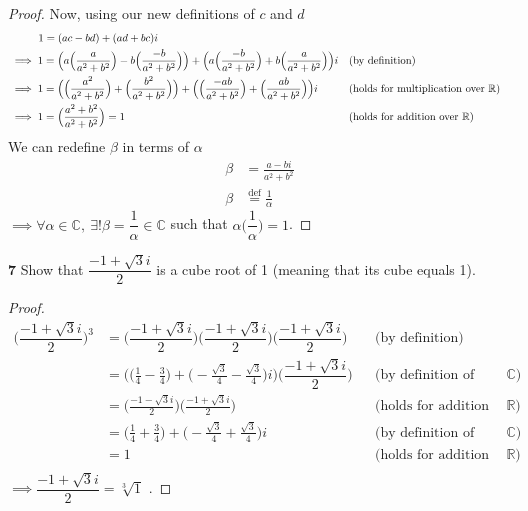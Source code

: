 \documentclass{article}
\begin{document}
\begin{proof}
    \indent Now, using our new definitions of $c$ and $d$
    \begin{align*}
        &\hspace{9.75 mm} 1 = (ac - bd) + (ad + bc)i \\
        &\implies 1 = \Big(a\Big(\frac{a}{a^{2} + b^{2}}\Big) - b\Big(\frac{-b}{a^{2} + b^{2}}\Big)\Big) + \Big(a\Big(\frac{-b}{a^{2} + b^{2}}\Big) + b\Big(\frac{a}{a^{2} + b^{2}}\Big)\Big)i &&\text{(by definition)}\\
        &\implies 1 = \Big(\Big(\frac{a^{2}}{a^{2} + b^{2}}\Big) + \Big(\frac{b^{2}}{a^{2} + b^{2}}\Big)\Big) + \Big(\Big(\frac{-ab}{a^{2} + b^{2}}\Big) + \Big(\frac{ab}{a^{2} + b^{2}}\Big)\Big)i &&\text{(holds for multiplication over $\mathbb{R}$)}\\
        &\implies 1 = \Big(\frac{a^{2} + b^{2}}{a^{2} + b^{2}}\Big) = 1 &&\text{(holds for addition over $\mathbb{R}$)}\\
    \end{align*}
    \indent We can redefine $\beta$ in terms of $\alpha$
    \begin{align*}
        \beta &= \frac{a - bi}{a^{2} + b^{2}}\\
        \beta &\stackrel{\text{def}}{=} \frac{1}{\alpha}
    \end{align*}
    $\implies \forall \alpha \in \mathbb{C}, \ \exists! \beta = \dfrac{1}{\alpha} \in \mathbb{C}$ such that $\alpha\Big(\dfrac{1}{\alpha}\Big) = 1$.
    
\end{proof}
\color{black}

\pagebreak

\noindent \textbf{7} \hspace{3 mm} Show that $\dfrac{-1 + \sqrt{3}i}{2}$ is a cube root of 1 (meaning that its cube equals 1). \color{red}

\begin{proof}
    \begin{align*}
        \Big(\dfrac{-1 + \sqrt{3}i}{2}\Big)^{3} &= \Big(\dfrac{-1 + \sqrt{3}i}{2}\Big)\Big(\dfrac{-1 + \sqrt{3}i}{2}\Big)\Big(\dfrac{-1 + \sqrt{3}i}{2}\Big) &&\text{(by definition)}\\
        &= \Big(\Big(\frac{1}{4} - \frac{3}{4}\Big) + \Big(-\frac{\sqrt{3}}{4} - \frac{\sqrt{3}}{4}\Big)i\Big)\Big(\dfrac{-1 + \sqrt{3}i}{2}\Big) &&\text{(by definition of multiplication over $\mathbb{C}$)}\\
        &= \Big(\frac{-1 - \sqrt{3}i}{2}\Big)\Big(\frac{-1 + \sqrt{3}i}{2}\Big) &&\text{(holds for addition over $\mathbb{R}$)}\\
        &= \Big(\frac{1}{4} + \frac{3}{4}\Big) + \Big(-\frac{\sqrt{3}}{4} + \frac{\sqrt{3}}{4}\Big)i &&\text{(by definition of multiplication over $\mathbb{C}$)}\\
        &= 1 &&\text{(holds for addition over $\mathbb{R}$)}\\
    \end{align*}
    $\implies \dfrac{-1 + \sqrt{3}i}{2} = \sqrt[3]{1}$ .
    
\end{proof}
\color{black}
\end{document}
